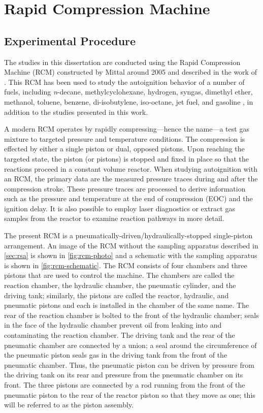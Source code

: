 \documentclass[../main.tex]{subfiles}
\begin{document}
\section{Rapid Compression Machine}
\label{sec:rcm}
\subsection{Experimental Procedure}
\label{sec:rcm-procedure}
The studies in this dissertation are conducted using the Rapid
Compression Machine (RCM) constructed by Mittal around 2005 and described in the
work of \textcite{Mittal2007,Mittal2006a}. This RCM has been used to
study the autoignition behavior of a number of fuels, including
\textit{n}-decane, methylcyclohexane, hydrogen, syngas,
dimethyl ether, methanol, toluene, benzene, di-isobutylene, iso-octane,
jet fuel, and gasoline \cite{Kumar2009, Mittal2009, Das2012a, Mittal2006,
Das2012, Mittal2008a, Kumar2011a, Mittal2007a, Mittal2008, Kumar2010,
Dooley2010, Dooley2012, Hui2012a, Keromnes2013, Kukkadapu2013, Kukkadapu2012a},
in addition to the studies presented in this work.

A modern RCM operates by rapidly compressing---hence the name---a test gas
mixture to targeted pressure and temperature conditions. The compression
is effected by either a single piston or dual, opposed pistons. Upon
reaching the targeted state, the piston (or pistons) is stopped and
fixed in place so that the reactions proceed in a constant volume
reactor. When studying autoignition with an RCM, the primary data are
the measured pressure traces during and after the compression stroke.
These pressure traces are processed to derive information such as the
pressure and temperature at the end of compression (EOC) and the
ignition delay. It is also possible to employ laser diagnostics or
extract gas samples from the reactor to examine reaction pathways in
more detail.

The present RCM is a pneumatically-driven/hydraulically-stopped
single-piston arrangement. An image of the RCM without the sampling
apparatus described in \cref{sec:rsa} is shown in
\cref{fig:rcm-photo} and a schematic with the sampling apparatus is
shown in \cref{fig:rcm-schematic}. The RCM consists of four chambers and
three pistons that are used to control the machine. The chambers are
called the reaction chamber, the hydraulic chamber, the pneumatic
cylinder, and the driving tank; similarly, the pistons are called
the reactor, hydraulic, and pneumatic pistons and each is installed
in the chamber of the same name. The rear of the reaction chamber
is bolted to the front of the hydraulic chamber; seals in the face
of the hydraulic chamber prevent oil from leaking into and contaminating
the reaction chamber. The driving tank and the rear of the pneumatic
chamber are connected by a union; a seal around the circumference of
the pneumatic piston seals gas in the driving tank from the front of
the pneumatic chamber. Thus, the pneumatic piston can be driven by
pressure from the driving tank on its rear and pressure from the
pneumatic chamber on its front. The three pistons are connected by
a rod running from the front of the pneumatic piston to the rear of
the reactor piston so that they move as one; this will be referred
to as the piston assembly.
\end{document}

